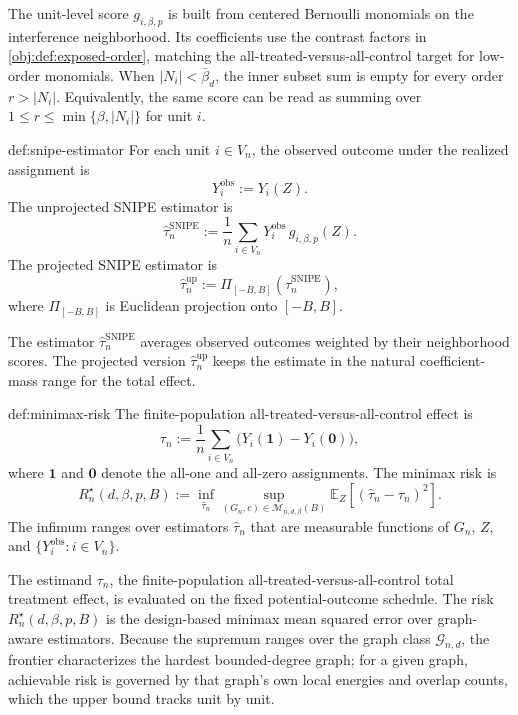 The unit-level score \(g_{i,\beta,p}\) is built from centered Bernoulli monomials on the interference neighborhood. Its coefficients use the contrast factors in \cref{obj:def:exposed-order}, matching the all-treated-versus-all-control target for low-order monomials. When \(|N_i|<\bar\beta_d\), the inner subset sum is empty for every order \(r>|N_i|\). Equivalently, the same score can be read as summing over \(1\le r\le \min\{\beta,|N_i|\}\) for unit \(i\).

\begin{definitionv}{def:snipe-estimator}
For each unit \(i\in V_n\), the observed outcome under the realized assignment is
\[
Y_i^{\mathrm{obs}}:=Y_i(Z).
\]
The unprojected SNIPE estimator is
\[
\widehat\tau_n^{\mathrm{SNIPE}}
:=
\frac{1}{n}
\sum_{i\in V_n}
Y_i^{\mathrm{obs}}\,g_{i,\beta,p}(Z).
\]
The projected SNIPE estimator is
\[
\widehat\tau_n^{\mathrm{up}}
:=
\Pi_{[-B,B]}
\left(
\widehat\tau_n^{\mathrm{SNIPE}}
\right),
\]
where \(\Pi_{[-B,B]}\) is Euclidean projection onto \([-B,B]\).
\end{definitionv}

The estimator \(\widehat\tau_n^{\mathrm{SNIPE}}\) averages observed outcomes weighted by their neighborhood scores. The projected version \(\widehat\tau_n^{\mathrm{up}}\) keeps the estimate in the natural coefficient-mass range for the total effect.

\begin{definitionv}{def:minimax-risk}
The finite-population all-treated-versus-all-control effect is
\[
\tau_n:=\frac{1}{n}\sum_{i\in V_n}\bigl(Y_i(\mathbf 1)-Y_i(\mathbf 0)\bigr),
\]
where \(\mathbf 1\) and \(\mathbf 0\) denote the all-one and all-zero assignments. The minimax risk is
\[
R_n^\star(d,\beta,p,B)
:=
\inf_{\widehat\tau_n}
\sup_{(G_n,c)\in\mathcal M_{n,d,\beta}(B)}
\mathbb E_Z
\left[
\left(
\widehat\tau_n-\tau_n
\right)^2
\right].
\]
The infimum ranges over estimators \(\widehat\tau_n\) that are measurable functions of \(G_n\), \(Z\), and \(\{Y_i^{\mathrm{obs}}:i\in V_n\}\).
\end{definitionv}

The estimand \(\tau_n\), the finite-population all-treated-versus-all-control total treatment effect, is evaluated on the fixed potential-outcome schedule. The risk \(R_n^\star(d,\beta,p,B)\) is the design-based minimax mean squared error over graph-aware estimators. Because the supremum ranges over the graph class \(\mathcal G_{n,d}\), the frontier characterizes the hardest bounded-degree graph; for a given graph, achievable risk is governed by that graph's own local energies and overlap counts, which the upper bound tracks unit by unit.

